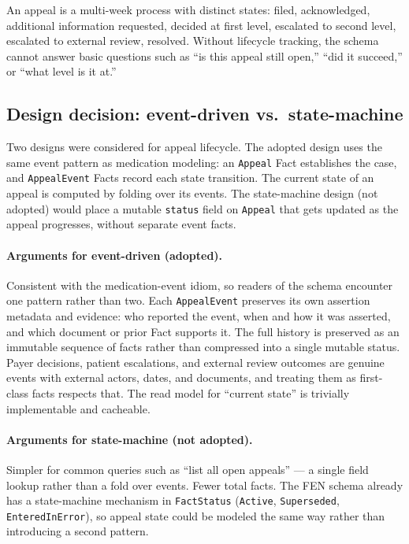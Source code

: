 \documentclass[11pt]{article}
\begin{document}
An appeal is a multi-week process with distinct states: filed,
acknowledged, additional information requested, decided at first level,
escalated to second level, escalated to external review, resolved.
Without lifecycle tracking, the schema cannot answer basic questions
such as ``is this appeal still open,'' ``did it succeed,'' or ``what
level is it at.''

\subsection{Design decision: event-driven vs.\ state-machine}

Two designs were considered for appeal lifecycle. The adopted design uses the
same event pattern as medication modeling: an \texttt{Appeal} Fact establishes
the case, and \texttt{AppealEvent} Facts record each state transition. The
current state of an appeal is computed by folding over its events. The
state-machine design (not adopted) would place a mutable \texttt{status}
field on \texttt{Appeal} that gets updated as the appeal progresses,
without separate event facts.

\paragraph{Arguments for event-driven (adopted).}
Consistent with the medication-event idiom, so
readers of the schema encounter one pattern rather than two. Each
\texttt{AppealEvent} preserves its own assertion metadata and evidence: who
reported the event, when and how it was asserted, and which document or prior
Fact supports it. The full
history is preserved as an immutable sequence of facts rather than
compressed into a single mutable status. Payer decisions, patient
escalations, and external review outcomes are genuine events with
external actors, dates, and documents, and treating them as first-class
facts respects that. The read model for ``current state'' is trivially
implementable and cacheable.

\paragraph{Arguments for state-machine (not adopted).}
Simpler for common queries such as ``list all open appeals'' --- a
single field lookup rather than a fold over events. Fewer total facts.
The FEN schema already has a state-machine mechanism in
\texttt{FactStatus} (\texttt{Active}, \texttt{Superseded},
\texttt{EnteredInError}), so appeal state could be modeled the same way
rather than introducing a second pattern.
\end{document}
